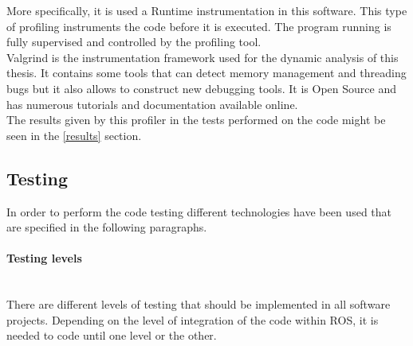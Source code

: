 		More specifically, it is used a Runtime instrumentation in this software. This type of profiling instruments the code before it is executed. The program running is fully supervised and controlled by the profiling tool. 
		\\

		Valgrind \cite{valgrind} is the instrumentation framework used for the dynamic analysis of this thesis. It contains some tools that can detect memory management and threading bugs but it also allows to construct new debugging tools. It is Open Source and has numerous tutorials and documentation available online. \\

		The results given by this profiler in the tests performed on the code might be seen in the \ref{results} section. 


	\subsection{Testing}
		\label{technologies_testing}
		In order to perform the code testing different technologies have been used that are specified in the following paragraphs. 
		\\


		\paragraph {Testing levels}\mbox{} \\

		There are different levels of testing that should be implemented in all software projects. Depending on the level of integration of the code within ROS, it is needed to code until one level or the other. 		\\

